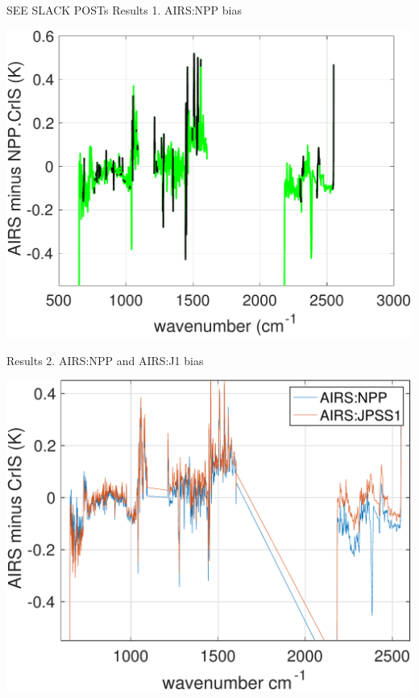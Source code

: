 \documentclass[10pt,t]{beamer}
\begin{document}
\begin{frame}{SEE SLACK POSTs Results 1. AIRS:NPP bias}

\vspace{-0.1in}
\begin{block}{}
  \begin{center}
    \includegraphics[width=0.6\linewidth]{./Figs/2018_airs_npp_ac1_stats_bias_wbad_fill.pdf}
  \end{center}
\end{block}
    
\end{frame}

\begin{frame}{Results 2. AIRS:NPP and AIRS:J1 bias}

\vspace{-0.1in}
\begin{block}{}
  \begin{center}
    \includegraphics[width=0.6\linewidth]{./Figs/2018d060_2019d059_ac1_ac2_sno_mean_bias.pdf}
  \end{center}
\end{block}
    
\end{frame}
\end{document}
